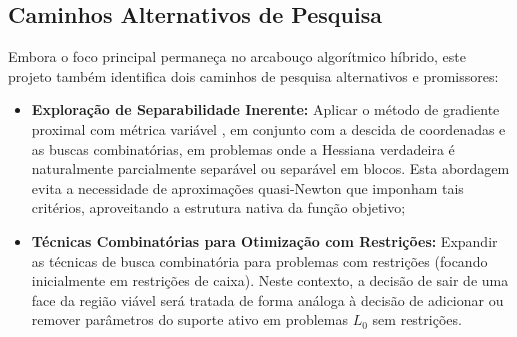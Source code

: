 \subsection{Caminhos Alternativos de Pesquisa}
Embora o foco principal permaneça no arcabouço algorítmico híbrido, este projeto também identifica dois caminhos de pesquisa alternativos e promissores:
\begin{itemize}
    \item \textbf{Exploração de Separabilidade Inerente:} Aplicar o método de gradiente proximal com métrica variável \cite{Leconte_2024}, em conjunto com a descida de coordenadas e as buscas combinatórias, em problemas onde a Hessiana verdadeira é naturalmente parcialmente separável ou separável em blocos. Esta abordagem evita a necessidade de aproximações quasi-Newton que imponham tais critérios, aproveitando a estrutura nativa da função objetivo;
    \item \textbf{Técnicas Combinatórias para Otimização com Restrições:} Expandir as técnicas de busca combinatória para problemas com restrições (focando inicialmente em restrições de caixa). Neste contexto, a decisão de sair de uma face da região viável será tratada de forma análoga à decisão de adicionar ou remover parâmetros do suporte ativo em problemas $L_0$ sem restrições.
\end{itemize}

